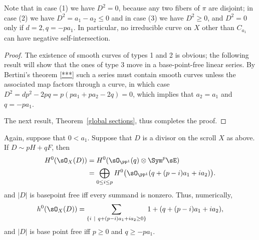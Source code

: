 Note that in case (1) we have $D^{2} = 0$, because any two fibers of $\pi$ are disjoint; in case (2) we have $D^{2}= a_{1}-a_{2}\leq 0$ and in case (3) we have $D^{2}\geq 0$, and $D^2=0$ only if
$d=2, q = -pa_1$. In particular, no irreducible curve
on $X$ other than $C_{a_1}$ can have negative self-intersection.

\begin{proof}
The existence of smooth curves of types 1 and 2 is obvious; the following result will show that
the ones of type 3 move in a base-point-free linear series. By Bertini's theorem \ref{***} such a series must contain smooth curves unless the associated map factors through a curve, in which case $D^2 = dp^2-2pq = p(pa_1+pa_2 -2 q) = 0$, which implies that $a_2=a_1$ and $q= -pa_1$.

The next result, Theorem~\ref{global sections}, thus completes the proof.
\end{proof}

\begin{theorem}\label{global sections} Again, suppose that $0<a_{1}$.
Suppose that $D$ is a divisor on the scroll $X$ as above. If $D \sim pH+qF$, then 
\begin{align*}
 H^{0}(\sO_{X}(D)) &= H^{0}(\sO_{\PP^{1}}(q) \otimes \Sym^{p} \sE)\\
 &= 
\bigoplus_{0\leq i\leq p}H^{0}\bigl(\sO_{\PP^{1}}(q + (p-i)a_{1}+i a_{2})\bigr).
\end{align*}
and $|D|$ is basepoint free iff every summand is nonzero.
Thus, numerically,
$$
h^{0}(\sO_{X}(D)) = 
\sum_{\{i\ \mid\ q+(p-i)a_{1}+i a_{2} \geq 0\}}1+(q + (p-i)a_{1}+i a_{2}),
$$
and
$|D|$ is base point free iff $p\geq 0$ and $q\geq -pa_{1}$.
\end{theorem}

